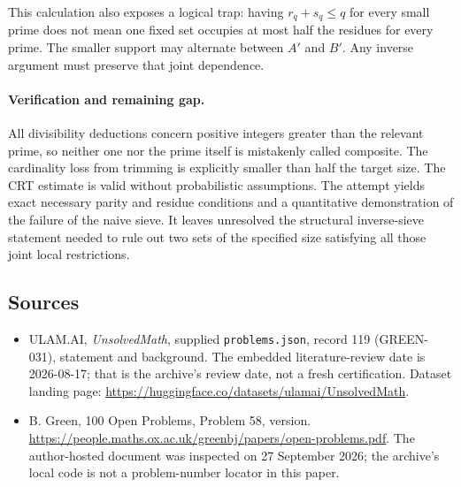 \documentclass[11pt,a4paper]{article}
\begin{document}
This calculation also exposes a logical trap: having $r_q+s_q\leq q$ for every small prime does not mean one fixed set occupies at most half the residues for every prime. The smaller support may alternate between $A'$ and $B'$. Any inverse argument must preserve that joint dependence.

\paragraph{Verification and remaining gap.}
All divisibility deductions concern positive integers greater than the relevant prime, so neither one nor the prime itself is mistakenly called composite. The cardinality loss from trimming is explicitly smaller than half the target size. The CRT estimate is valid without probabilistic assumptions. The attempt yields exact necessary parity and residue conditions and a quantitative demonstration of the failure of the naive sieve. It leaves unresolved the structural inverse-sieve statement needed to rule out two sets of the specified size satisfying all those joint local restrictions.

\subsection{Sources}

{\small

\begin{itemize}

\item[\hypertarget{source:119:1}{S1}] ULAM.AI, \emph{UnsolvedMath}, supplied \texttt{problems.json}, record 119 (GREEN-031), statement and background. The embedded literature-review date is 2026-08-17; that is the archive’s review date, not a fresh certification. Dataset landing page: \url{https://huggingface.co/datasets/ulamai/UnsolvedMath}.

\item[\hypertarget{source:119:2}{S2}] B. Green, 100 Open Problems, Problem 58, version. \url{https://people.maths.ox.ac.uk/greenbj/papers/open-problems.pdf}. The author-hosted document was inspected on 27 September 2026; the archive’s local code is not a problem-number locator in this paper.

\end{itemize}

}

\label{end:119}
\end{document}
